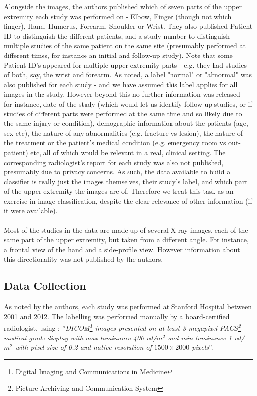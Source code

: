 \documentclass[11pt]{article} %
\theoremstyle{plain}
\theoremstyle{definition}
\begin{document}
Alongside the images, the authors published which of seven parts of the upper extremity each study was performed on - Elbow, Finger (though not which finger), Hand, Humerus, Forearm, Shoulder or Wrist. They also published Patient ID to distinguish the different patients, and a study number to distinguish multiple studies of the same patient on the same site (presumably performed at different times, for instance an initial and follow-up study). Note that some Patient ID's appeared for multiple upper extremity parts - e.g. they had studies of both, say, the wrist and forearm. As noted, a label "normal" or "abnormal" was also published for each study - and we have assumed this label applies for all images in the study. However beyond this no further information was released - for instance, date of the study (which would let us identify follow-up studies, or if studies of different parts were performed at the same time and so likely due to the same injury or condition), demographic information about the patients (age, sex etc), the nature of any abnormalities (e.g. fracture vs lesion), the nature of the treatment or the patient's medical condition (e.g. emergency room vs out-patient) etc, all of which would be relevant in a real, clinical setting. The corresponding radiologist's report for each study was also not published, presumably due to privacy concerns. As such, the data available to build a classifier is really just the images themselves, their study's label, and which part of the upper extremity the images are of. Therefore we treat this task as an exercise in image classification, despite the clear relevance of other information (if it were available).
\\
\\
\noindent
Most of the studies in the data are made up of several X-ray images, each of the same part of the upper extremity, but taken from a different angle. For instance, a frontal view of the hand and a side-profile view. However information about this directionality was not published by the authors. 

\subsection{Data Collection}
As noted by the authors, each study was performed at Stanford Hospital between 2001 and 2012. The labelling was performed manually by a board-certified radiologist, using \cite{MURA2017}: ''\textit{DICOM\footnote{Digital Imaging and Communications in Medicine} images presented on at least 3 megapixel PACS\footnote{Picture Archiving and Communication System} medical grade display with max luminance 400 cd/\(m^2\) and min luminance 1 cd/\(m^2\) with pixel size of 0.2 and native resolution of \(1500 \times 2000\) pixels}''.
\end{document}
